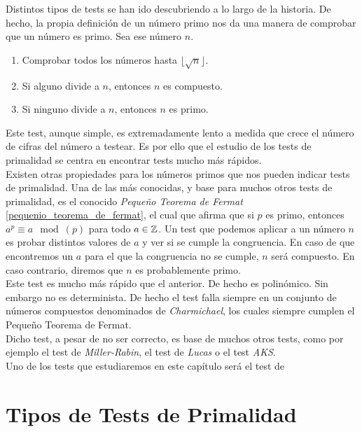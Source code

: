 Distintos tipos de tests se han ido descubriendo a lo largo de la historia. De hecho, la propia definición de un número primo nos da una manera de comprobar que un número es primo. Sea ese número $n$.

\begin{enumerate}
	\item Comprobar todos los números hasta $\lfloor\sqrt{n}\rfloor$.
	
	\item Si alguno divide a $n$, entonces $n$ es compuesto.
	
	\item Si ninguno divide a $n$, entonces $n$ es primo.
\end{enumerate}

Este test, aunque simple, es extremadamente lento a medida que crece el número de cifras del número a testear. Es por ello que el estudio de los tests de primalidad se centra en encontrar tests mucho más rápidos.\\

Existen otras propiedades para los números primos que nos pueden indicar tests de primalidad. Una de las más conocidas, y base para muchos otros tests de primalidad, es el conocido \textit{Pequeño Teorema de Fermat} \ref{pequenio_teorema_de_fermat}, el cual que afirma que si $p$ es primo, entonces $a^p \equiv a \mod(p)$ para todo $a \in \mathbb{Z}$. Un test que podemos aplicar a un número $n$ es probar distintos valores de $a$ y ver si se cumple la congruencia. En caso de que encontremos un $a$ para el que la congruencia no se cumple, $n$ será compuesto. En caso contrario, diremos que $n$ es probablemente primo.\\

Este test es mucho más rápido que el anterior. De hecho es polinómico. Sin embargo no es determinista. De hecho el test falla siempre en un conjunto de números compuestos denominados de \textit{Charmichael}, los cuales siempre cumplen el Pequeño Teorema de Fermat.\\

Dicho test, a pesar de no ser correcto, es base de muchos otros tests, como por ejemplo el test de \textit{Miller-Rabin}, el test de \textit{Lucas} o el test \textit{AKS}.\\

Uno de los tests que estudiaremos en este capítulo será el test de 

\section{Tipos de Tests de Primalidad}

